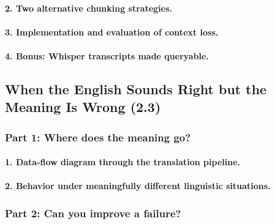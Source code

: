 \documentclass[11pt]{article}
\begin{document}
\paragraph{2. Two alternative chunking strategies.}
%

\paragraph{3. Implementation and evaluation of context loss.}
%

\paragraph{4. Bonus: Whisper transcripts made queryable.}
%

\subsection{When the English Sounds Right but the Meaning Is Wrong (2.3)}

\subsubsection*{Part 1: Where does the meaning go?}

\paragraph{1. Data-flow diagram through the translation pipeline.}
%

\paragraph{2. Behavior under meaningfully different linguistic situations.}
%

\subsubsection*{Part 2: Can you improve a failure?}
\end{document}
